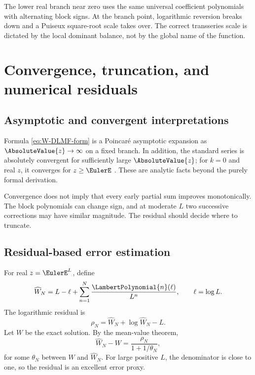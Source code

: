 \documentclass[11pt,openany]{book}
\theoremstyle{definition}
\theoremstyle{plain}
\theoremstyle{remark}
\newcommand{\LambertAsymptoticApproximation}[1]{\widehat{W}_{#1}}
\begin{document}
\begin{summarybox}
The lower real branch near zero uses the same universal coefficient polynomials with alternating block signs. At the branch point, logarithmic reversion breaks down and a Puiseux square-root scale takes over. The correct transseries scale is dictated by the local dominant balance, not by the global name of the function.
\end{summarybox}

\chapter{Convergence, truncation, and numerical residuals}\label{ch:W-numerics}

\section{Asymptotic and convergent interpretations}
Formula \cref{eq:W-DLMF-form} is a Poincar\'e asymptotic expansion as \(\AbsoluteValue{z}\to\infty\) on a fixed branch. In addition, the standard series is absolutely convergent for sufficiently large \(\AbsoluteValue{z}\); for \(k=0\) and real \(z\), it converges for \(z\ge \EulerE\) \cite{dlmf-W,corless-W}. These are analytic facts beyond the purely formal derivation.

Convergence does not imply that every early partial sum improves monotonically. The block polynomials can change sign, and at moderate \(L\) two successive corrections may have similar magnitude. The residual should decide where to truncate.

\section{Residual-based error estimation}
For real \(z=\EulerE^L\), define
\[
 \LambertAsymptoticApproximation{N}=L-\ell+\sum_{n=1}^N\frac{\LambertPolynomial{n}(\ell)}{L^n},
 \qquad \ell=\log L.
\]
The logarithmic residual is
\begin{equation}\label{eq:numeric-residual}
 \rho_N=\LambertAsymptoticApproximation{N}+\log\LambertAsymptoticApproximation{N}-L.
\end{equation}
Let \(W\) be the exact solution. By the mean-value theorem,
\begin{equation}\label{eq:residual-error-relation}
 \LambertAsymptoticApproximation{N}-W
 =\frac{\rho_N}{1+1/\theta_N},
\end{equation}
for some \(\theta_N\) between \(W\) and \(\LambertAsymptoticApproximation{N}\). For large positive \(L\), the denominator is close to one, so the residual is an excellent error proxy.
\end{document}
